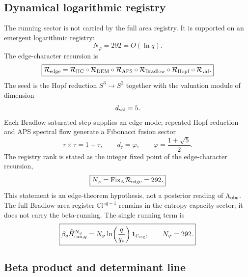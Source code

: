 \documentclass[aps,prd,reprint,nofootinbib,superscriptaddress,floatfix]{revtex4-2}
\numberwithin{equation}{section}
\theoremstyle{definition}
\theoremstyle{plain}
\begin{document}
\subsection{Dynamical logarithmic registry}

The running sector is not carried by the full area registry.  It is supported
on an emergent logarithmic registry:
\[
\boxed{
N_\varphi=292=O(\ln q).
}
\]
The edge-character recursion is
\[
\boxed{
\mathcal R_{\rm edge}
=
\mathcal R_{\rm HC}
\circ\mathcal R_{\rm DEM}
\circ\mathcal R_{\rm APS}
\circ\mathcal R_{\rm Bradlow}
\circ\mathcal R_{\rm Hopf}
\circ\mathcal R_{\rm val}.
}
\]
The seed is the Hopf reduction \(S^3\to S^2\) together with the valuation
module of dimension
\[
d_{\rm val}=5.
\]
Each Bradlow-saturated step supplies an edge mode; repeated Hopf reduction and
APS spectral flow generate a Fibonacci fusion sector
\[
\tau\times\tau=1+\tau,
\qquad
d_\tau=\varphi,
\qquad
\varphi=\frac{1+\sqrt5}{2}.
\]
The registry rank is stated as the integer fixed point of the edge-character
recursion,
\[
\boxed{
N_\varphi
=
\operatorname{Fix}_{\mathbb Z}\mathcal R_{\rm edge}
=
292.
}
\]
This statement is an edge-theorem hypothesis, not a posterior reading of
\(\Lambda_{\rm obs}\).  The full Bradlow area register
\(\mathbb{CP}^{q-1}\) remains in the entropy capacity sector; it does not carry
the beta-running.  The single running term is
\[
\boxed{
\beta_q\widehat H_{{\rm run},q}^{N_\varphi}
=
N_\varphi
\ln\!\left(\frac{q}{q_\star}\right)
\mathbf 1_{\mathcal C_{\rm reg}},
\qquad
N_\varphi=292.
}
\]

\subsection{Beta product and determinant line}
\end{document}

